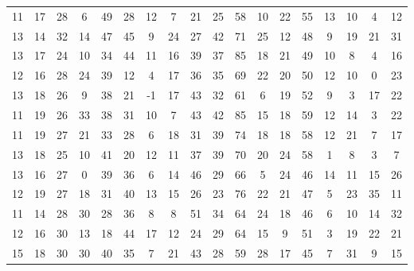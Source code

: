 \begin{sidewaystable}
\begin{tabular}{cccccccccccccccccc}
    11    & 17    & 28    & 6     & 49    & 28    & 12    & 7     & 21    & 25     & 58     & 10     & 22     & 55     & 13     & 10     & 4      & 12     \\
    13    & 14    & 32    & 14    & 47    & 45    & 9     & 24    & 27    & 42     & 71     & 25     & 12     & 48     & 9      & 19     & 21     & 31     \\
    13    & 17    & 24    & 10    & 34    & 44    & 11    & 16    & 39    & 37     & 85     & 18     & 21     & 49     & 10     & 8      & 4      & 16     \\
    12    & 16    & 28    & 24    & 39    & 12    & 4     & 17    & 36    & 35     & 69     & 22     & 20     & 50     & 12     & 10     & 0      & 23     \\
    13    & 18    & 26    & 9     & 38    & 21    & -1    & 17    & 43    & 32     & 61     & 6      & 19     & 52     & 9      & 3      & 17     & 22     \\
    11    & 19    & 26    & 33    & 38    & 31    & 10    & 7     & 43    & 42     & 85     & 15     & 18     & 59     & 12     & 14     & 3      & 22     \\
    11    & 19    & 27    & 21    & 33    & 28    & 6     & 18    & 31    & 39     & 74     & 18     & 18     & 58     & 12     & 21     & 7      & 17     \\
    13    & 18    & 25    & 10    & 41    & 20    & 12    & 11    & 37    & 39     & 70     & 20     & 24     & 58     & 1      & 8      & 3      & 7      \\
    13    & 16    & 27    & 0     & 39    & 36    & 6     & 14    & 46    & 29     & 66     & 5      & 24     & 46     & 14     & 11     & 15     & 26     \\
    12    & 19    & 27    & 18    & 31    & 40    & 13    & 15    & 26    & 23     & 76     & 22     & 21     & 47     & 5      & 23     & 35     & 11     \\
    11    & 14    & 28    & 30    & 28    & 36    & 8     & 8     & 51    & 34     & 64     & 24     & 18     & 46     & 6      & 10     & 14     & 32     \\
    12    & 16    & 30    & 13    & 18    & 44    & 17    & 12    & 24    & 29     & 64     & 15     & 9      & 51     & 3      & 19     & 22     & 21     \\
    15    & 18    & 30    & 30    & 40    & 35    & 7     & 21    & 43    & 28     & 59     & 28     & 17     & 45     & 7      & 31     & 9      & 15     \\
         \end{tabular}
\end{sidewaystable}

